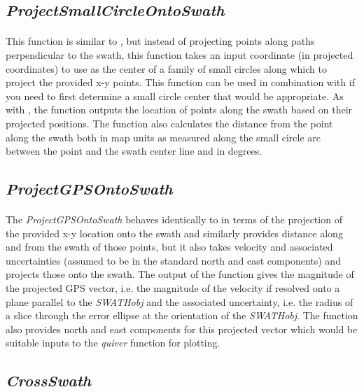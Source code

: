 \subsection{\textit{ProjectSmallCircleOntoSwath}}
\paragraph{}This function is similar to , but instead of projecting points along paths perpendicular to the swath, this function takes an input coordinate (in projected coordinates) to use as the center of a family of small circles along which to project the provided x-y points. This function can be used in combination with  if you need to first determine a small circle center that would be appropriate. As with , the function outputs the location of points along the swath based on their projected positions. The function also calculates the distance from the point along the swath both in map units as measured along the small circle arc between the point and the swath center line and in degrees.

\subsection{\textit{ProjectGPSOntoSwath}}
\paragraph{}The \textit{ProjectGPSOntoSwath} behaves identically to  in terms of the projection of the provided x-y location onto the swath and similarly provides distance along and from the swath of those points, but it also takes velocity and associated uncertainties (assumed to be in the standard north and east components) and projects those onto the swath. The output of the function gives the magnitude of the projected GPS vector, i.e. the magnitude of the velocity if resolved onto a plane parallel to the \textit{SWATHobj} and the associated uncertainty, i.e. the radius of a slice through the error ellipse at the orientation of the \textit{SWATHobj}. The function also provides north and east components for this projected vector which would be suitable inputs to the \textit{quiver} function for plotting.

\subsection{\textit{CrossSwath}}
